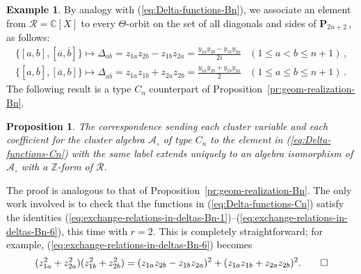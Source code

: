 \documentclass[letterpaper]{amsart}
\numberwithin{equation}{section}
\newtheorem{proposition}[theorem]{Proposition}
\theoremstyle{definition}
\newtheorem{example}[theorem]{Example}
\def\proof{\smallskip\noindent {\bf Proof.\ }}
\def\AA{\mathcal{A}}
\def\ZZ{\mathbb{Z}}
\def\CC{\mathbb{C}}
\def\Poly{\mathbf{P}}
\begin{document}
\begin{example}
 
By analogy with (\ref{eq:Delta-functions-Bn}), 
we associate an element from 
$\mathcal{R} = \CC[X]$ to every 
$\Theta$-orbit on the set of all diagonals and sides of 
$\Poly_{2n+2}\,$, as follows: 
\begin{equation} 
\label{eq:Delta-functions-Cn} 
\begin{array}{ll} 
\{[a,b], [\overline a, \overline b]\} \mapsto \Delta_{ab} 
= z_{1a} z_{2b} - z_{1b} z_{2a} 
= \displaystyle\frac{y_{1a}y_{2b} - y_{1b}y_{2a}}{2i} 
& (1 \leq a < b \leq n+1)\,,\\[.1in] 
\{[a,\overline b], [\overline a, b]\} \mapsto 
\Delta_{a \overline b} 
= z_{1a} z_{1b} + z_{2a} z_{2b} 
= \displaystyle\frac{y_{1a}y_{2b} + y_{1b}y_{2a}}{2} 
& (1 \leq a \leq b \leq n+1) \, . 
\end{array} 
\end{equation} 
The following result is a type $C_n$ counterpart of 
Proposition~\ref{pr:geom-realization-Bn}. 
\end{example} 
 
\begin{proposition} 
\label{pr:geom-realization-Cn} 
The correspondence sending each cluster variable 
and each coefficient for the cluster algebra 
$\AA_\circ$ of type $C_n$ to the element in {\rm (\ref{eq:Delta-functions-Cn})} 
with the same label extends uniquely to 
an algebra isomorphism of $\AA_\circ$ with a $\ZZ$-form of $\mathcal{R}$. 
\end{proposition} 
 
\proof 
The proof is analogous to that of 
Proposition~\ref{pr:geom-realization-Bn}. 
The only work involved is to check that the functions in 
(\ref{eq:Delta-functions-Cn}) satisfy the identities 
(\ref{eq:exchange-relations-in-deltas-Bn-1})--(\ref{eq:exchange-relations-in-deltas-Bn-6}), 
this time with $r= 2$. 
This is completely straightforward; for example, 
(\ref{eq:exchange-relations-in-deltas-Bn-6}) becomes 
\[ 
(z_{1a}^2 + z_{2a}^2)(z_{1b}^2 + z_{2b}^2) = 
(z_{1a} z_{2b} - z_{1b} z_{2a})^2 + 
(z_{1a} z_{1b} + z_{2a}z_{2b})^2 
.\hfil \qed 
\] 
 
 
\end{document}
